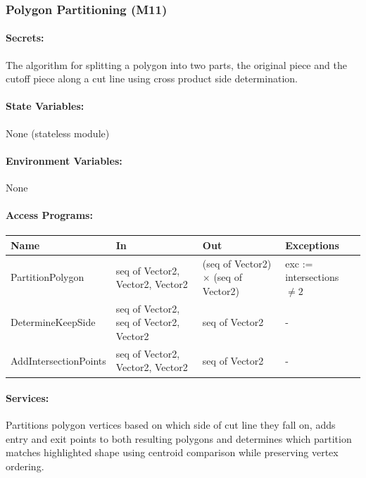 \documentclass[12pt, titlepage]{article}
\begin{document}
\vspace{10mm}

\subsubsection{Polygon Partitioning (M11)} \label{M11}

\paragraph{Secrets:}
The algorithm for splitting a polygon into two parts, the original piece and the cutoff piece along a cut line using cross product side determination.

\paragraph{State Variables:}
None (stateless module)

\paragraph{Environment Variables:}
None

\newpage

\paragraph{Access Programs:}

\begin{center}
\begin{tabular}{p{4cm}p{30mm}p{32mm}p{42mm}}
\toprule
\textbf{Name} & \textbf{In} & \textbf{Out} & \textbf{Exceptions} \\
\midrule
PartitionPolygon & seq of Vector2, Vector2, Vector2 & (seq of Vector2) $\times$ (seq of Vector2) & exc := intersections $\neq 2$ \\
DetermineKeepSide & seq of Vector2, seq of Vector2, Vector2 & seq of Vector2 & - \\
AddIntersectionPoints & seq of Vector2, Vector2, Vector2 & seq of Vector2 & - \\
\bottomrule
\end{tabular}
\end{center}

\paragraph{Services:}
Partitions polygon vertices based on which side of cut line they fall on, adds entry and exit points to both resulting polygons and determines which partition matches highlighted shape using centroid comparison while preserving vertex ordering.
\end{document}
